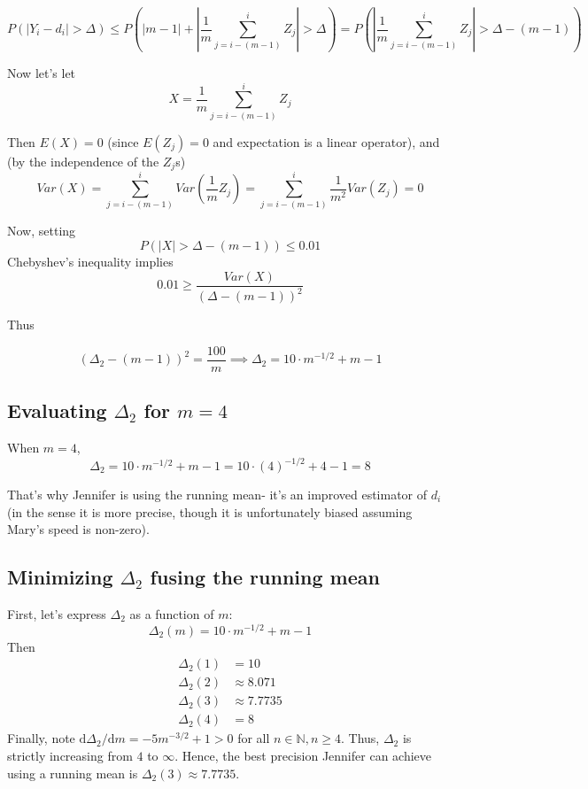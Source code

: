\documentclass[paper=a4, fontsize=11pt]{scrartcl} %
\numberwithin{equation}{section} %
\numberwithin{figure}{section} %
\numberwithin{table}{section} %
\begin{document}
\[ P( \left|Y_i - d_i \right| > \Delta ) \leq P\left( \left| m-1 \right| + \left| \frac{1}{m} \sum_{j = i - (m-1)}^{i} Z_j \right| > \Delta \right) = P\left( \left| \frac{1}{m} \sum_{j = i - (m-1)}^{i} Z_j \right| > \Delta - (m - 1)\right) \]

Now let's let
\[X = \frac{1}{m} \sum_{j = i - (m-1)}^{i} Z_j \]

Then $E(X) = 0$ (since $E(Z_j) = 0$ and expectation is a linear operator), and (by the independence of the $Z_j$s)
\[Var(X) =  \sum_{j = i - (m-1)}^{i} Var\left( \frac{1}{m} Z_j\right) = \sum_{j = i - (m-1)}^{i} \frac{1}{m^2} Var(Z_j) = 0\]

Now, setting
\[P\left( \left|X\right| > \Delta - (m-1) \right) \leq 0.01\]
Chebyshev's inequality implies
\[0.01 \geq \frac{Var(X)}{(\Delta - (m-1))^2}\]

Thus

\[(\Delta_2 - (m-1))^2 = \frac{100}{m} \implies \Delta_2 = 10 \cdot m^{-1/2} + m - 1 \]

\subsection{Evaluating $\Delta_2$ for $m = 4$}

When $m = 4$,
\[\Delta_2 = 10 \cdot m^{-1/2} + m - 1 = 10 \cdot (4)^{-1/2} + 4 - 1 = 8 \]

That's why Jennifer is using the running mean- it's an improved estimator of $d_i$ (in the sense it is more precise, though it is unfortunately biased assuming Mary's speed is non-zero).

\subsection{Minimizing $\Delta_2$ fusing the running mean}
First, let's express $\Delta_2$ as a function of $m$:
\[\Delta_2(m) = 10 \cdot m^{-1/2} + m - 1\]
Then
\begin{align*}
\Delta_2(1) &= 10\\
\Delta_2(2) &\approx 8.071\\
\Delta_2(3) &\approx 7.7735\\
\Delta_2(4) &= 8
\end{align*}
Finally, note $\textrm{d}\Delta_2/\textrm{d}m = -5 m^{-3/2} + 1 > 0$ for all $n \in \mathbb{N}, n \geq 4$. Thus, $\Delta_2$ is strictly increasing from $4$ to $\infty$. Hence, the best precision Jennifer can achieve using a running mean is $\Delta_2(3) \approx 7.7735$.
\end{document}
